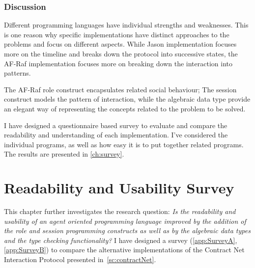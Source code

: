 \documentclass[a4paper,12pt,oneside,fleqn]{book} %
\begin{document}




\subsection{Discussion} %
Different programming languages have individual strengths and weaknesses.
This is one reason why specific implementations have distinct approaches to
the problems and focus on different aspects. While Jason implementation
focuses more on the timeline and breaks down the protocol into successive
states, the AF-Raf implementation focuses more on breaking down the
interaction into patterns.

The AF-Raf role construct encapsulates related social behaviour; The
session construct models the pattern of interaction, while the algebraic
data type provide an elegant way of representing the concepts related to
the problem to be solved. 

I have designed a questionnaire based survey to evaluate and compare the
readability and understanding of each implementation. I've considered the
individual programs, as well as how easy it is to put together related
programs. The results are presented in \autoref{ch:survey}.

\chapter{Readability and Usability Survey}\label{ch:survey} %

This chapter further investigates the research question:
\textit{Is the readability and usability of an agent oriented programming
  language improved by the addition of the role and session programming
  constructs as well as by the algebraic data types and the type checking
functionality?} I have designed a survey (\autoref{app:SurveyA},
\autoref{app:SurveyB}) to compare the
alternative implementations of the Contract Net Interaction Protocol
presented in~\autoref{sc:contractNet}.
\end{document}
